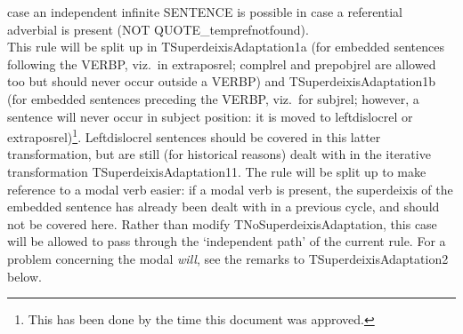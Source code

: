 \begin{description}
\begin{description}
case an independent infinite SENTENCE is possible in case a referential 
adverbial is present (NOT QUOTE\_temprefnotfound).\\
This rule will be split up in TSuperdeixisAdaptation1a 
(for embedded sentences following the VERBP, viz.\ in extraposrel; complrel and 
prepobjrel are allowed too but should never occur outside a VERBP) and 
TSuperdeixisAdaptation1b (for embedded sentences preceding the VERBP, viz.\ for 
subjrel; however, a sentence will never occur in subject position: it is moved 
to leftdislocrel or extraposrel)\footnote{This has been done by the time this 
document was approved.}. Leftdislocrel sentences should be covered 
in this latter transformation, but are still (for historical reasons) 
dealt with in the iterative 
transformation TSuperdeixisAdaptation11. The rule will be split up to make 
reference to a modal verb easier: if a modal verb is present, the superdeixis 
of the embedded sentence has already been dealt with in a previous cycle, and 
should not be covered here. Rather than modify TNoSuperdeixisAdaptation, this 
case will be allowed to pass through the `independent path' of the current 
rule. For 
a problem concerning the modal {\em will\/}, see the remarks to 
TSuperdeixisAdaptation2 below. 

\end{description}


\end{description}
